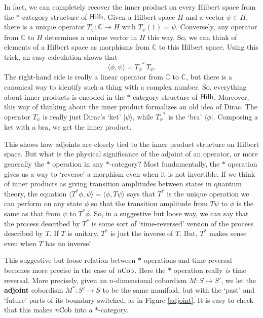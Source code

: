 \documentclass[12pt]{article}
\newcommand{\Hilb}{{\rm Hilb}}
\newcommand{\Cob}{{\rm Cob}}
\newcommand{\C}{{\mathbb C}}
\renewcommand{\to}{\rightarrow}
\newcommand{\maps}{\colon}
\begin{document}
In fact, we can completely recover the inner product on every
Hilbert space from the $\ast$-category structure of $\Hilb$.  
Given a Hilbert space $H$ and a vector $\psi \in H$,
there is a unique operator $T_\psi \maps \C \to H$ with $T_\psi(1) 
= \psi$.  Conversely, any operator from $\C$ to $H$ determines a
unique vector in $H$ this way.  So, we can think of elements of a 
Hilbert space as morphisms from $\C$ to this Hilbert space.  Using 
this trick, an easy calculation shows that
\[        \langle \phi,\psi \rangle = {T_\phi}^{\!\!\ast}\, T_\psi . \]
The right-hand side is really a linear operator from $\C$ to
$\C$, but there is a canonical way to identify such a thing with a
complex number.  So, everything about inner products is encoded in
the $\ast$-category structure of $\Hilb$.  Moreover, this way of
thinking about the inner product formalizes an old idea of Dirac.
The operator $T_\psi$ is really just Dirac's `ket' $|\psi\rangle$,
while ${T_\phi}^{\!\!\ast}$ is the `bra' $\langle \phi |$.  Composing
a ket with a bra, we get the inner product.

This shows how adjoints are closely tied to the inner product
structure on Hilbert space.  But what is the physical significance 
of the adjoint of an operator, or more generally the $\ast$ operation 
in any $\ast$-category?   Most fundamentally, the $\ast$ operation
gives us a way to `reverse' a morphism even when it is not 
invertible.  If we think of inner products as giving transition 
amplitudes between states in quantum theory, the equation
$ \langle T^\ast \phi,\psi \rangle = \langle \phi, T\psi \rangle $
says that $T^\ast$ is the unique operation we can perform on any state
$\phi$ so that the transition amplitude from $T \psi$ to $\phi$
is the same as that from $\psi$ to $T^\ast \phi$. 
So, in a suggestive but loose way, we can say that the process 
described by $T^\ast$ is some sort of `time-reversed' version of the 
process described by $T$.  If $T$ is unitary, $T^\ast$ is just the 
inverse of $T$.  But, $T^\ast$ makes sense even when $T$ has no inverse!  

This suggestive but loose relation between $\ast$ operations and 
time reversal becomes more precise in the case of $n\Cob$.
Here the $\ast$ operation really {\it is} time reversal.  More
precisely, given an $n$-dimensional cobordism $M \maps S \to S'$,
we let the {\bf adjoint} cobordism $M^\ast \maps S' \to S$ to be 
the same manifold, but with the `past' and `future' parts of its
boundary switched, as in Figure \ref{adjoint}.  It is easy to check
that this makes $n\Cob$ into a $\ast$-category.
\end{document}
